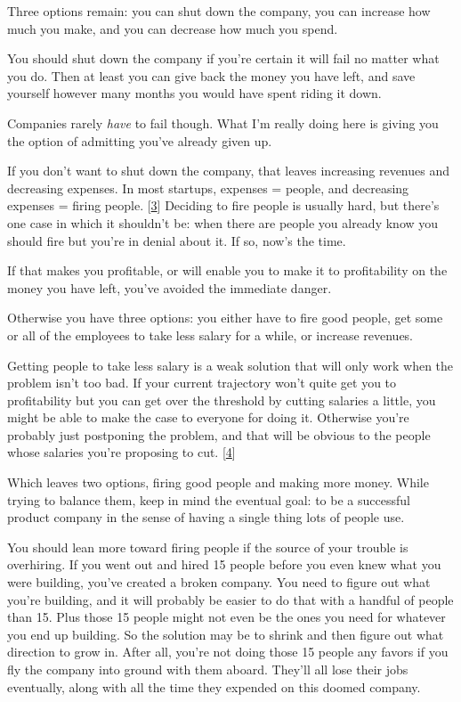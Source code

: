 Three options remain: you can shut down the company, you can increase
how much you make, and you can decrease how much you spend.

You should shut down the company if you're certain it will fail no
matter what you do. Then at least you can give back the money you have
left, and save yourself however many months you would have spent riding
it down.

Companies rarely \emph{have} to fail though. What I'm really doing here
is giving you the option of admitting you've already given up.

If you don't want to shut down the company, that leaves increasing
revenues and decreasing expenses. In most startups, expenses = people,
and decreasing expenses = firing people. {[}\hyperref[f3n]{3}{]}
Deciding to fire people is usually hard, but there's one case in which
it shouldn't be: when there are people you already know you should fire
but you're in denial about it. If so, now's the time.

If that makes you profitable, or will enable you to make it to
profitability on the money you have left, you've avoided the immediate
danger.

Otherwise you have three options: you either have to fire good people,
get some or all of the employees to take less salary for a while, or
increase revenues.

Getting people to take less salary is a weak solution that will only
work when the problem isn't too bad. If your current trajectory won't
quite get you to profitability but you can get over the threshold by
cutting salaries a little, you might be able to make the case to
everyone for doing it. Otherwise you're probably just postponing the
problem, and that will be obvious to the people whose salaries you're
proposing to cut. {[}\hyperref[f4n]{4}{]}

Which leaves two options, firing good people and making more money.
While trying to balance them, keep in mind the eventual goal: to be a
successful product company in the sense of having a single thing lots of
people use.

You should lean more toward firing people if the source of your trouble
is overhiring. If you went out and hired 15 people before you even knew
what you were building, you've created a broken company. You need to
figure out what you're building, and it will probably be easier to do
that with a handful of people than 15. Plus those 15 people might not
even be the ones you need for whatever you end up building. So the
solution may be to shrink and then figure out what direction to grow in.
After all, you're not doing those 15 people any favors if you fly the
company into ground with them aboard. They'll all lose their jobs
eventually, along with all the time they expended on this doomed
company.

